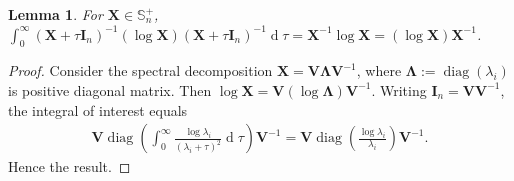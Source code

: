 \documentclass[letterpaper,10pt,twocolumn,conference]{ieeeconf}
\newtheorem{lemma}{Lemma}
\newcommand{\bbI}{\bm{I}}
\newcommand{\bbX}{\bm{X}}
\newcommand{\bbV}{\bm{V}}
\newcommand{\bbLambda}{\bm{\Lambda}}
\newcommand{\diag}{\operatorname{diag}}
\newcommand{\differential}{\operatorname{d}}
\begin{document}
\begin{lemma}\label{MatrixIntegralOfInverseLoginverse}
For $\bbX\in\mathbb{S}_{n}^{+}$, $\displaystyle\int_{0}^{\infty}\!\!\!\!(\bbX + \tau\bbI_{n})^{-1}\left(\log\bbX\right)(\bbX + \tau\bbI_{n})^{-1}\differential\tau \allowbreak = \bbX^{-1}\log\bbX =\allowbreak (\log\bbX)\bbX^{-1}$.		
\end{lemma}
\begin{proof}
Consider the spectral decomposition $\bbX = \bbV \bbLambda \bbV^{-1}$, where $\bbLambda:=\diag(\lambda_{i})$ is positive diagonal matrix. Then $\log\bbX = \bbV \left(\log\bbLambda\right) \bbV^{-1}$. Writing $\bbI_{n} = \bbV\bbV^{-1}$, the integral of interest equals 
\begin{align*}
	\bbV\diag\left(\int_{0}^{\infty}\!\!\!\!\frac{\log\lambda_{i}}{(\lambda_{i}+\tau)^{2}}\differential\tau\right)\bbV^{-1} = \bbV\diag\left(\frac{\log\lambda_{i}}{\lambda_{i}}\right)\bbV^{-1}.
\end{align*}
Hence the result.
\end{proof}
\end{document}
